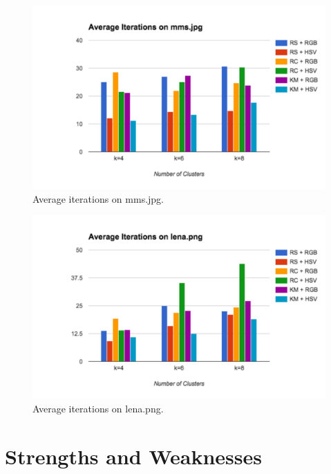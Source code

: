 \documentclass{article}
\begin{document}
\begin{figure}[ht]
\begin{center}
\includegraphics[width=1\textwidth]{images/mmsChart}
\caption{Average iterations on mms.jpg.}
\label{fig:mmsChart}
\end{center}
\end{figure}

\begin{figure}[ht]
\begin{center}
\includegraphics[width=1\textwidth]{images/lenaChart}
\caption{Average iterations on lena.png.}
\label{fig:mmsChart}
\end{center}
\end{figure}


\section{Strengths and Weaknesses}
\end{document}
